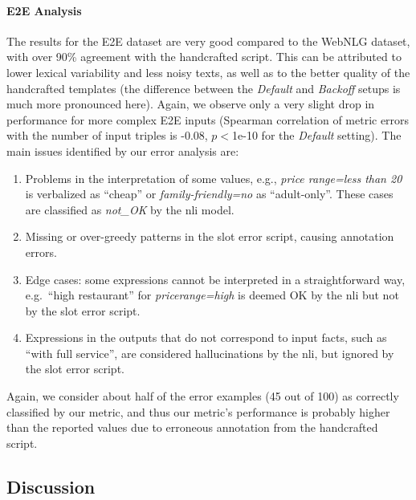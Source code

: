 




\paragraph{E2E Analysis} The results for the E2E dataset are very good compared to the WebNLG dataset, with over 90\% agreement with the handcrafted script. This can be attributed to lower lexical variability and less noisy texts, as well as to the better quality of the handcrafted templates (the difference between the \emph{Default} and \emph{Backoff} setups is much more pronounced here).
Again, we observe only a very slight drop in performance for more complex E2E inputs (Spearman correlation of metric errors with the number of input triples is -0.08, $p<$1e-10 for the \emph{Default} setting). The main issues identified by our error analysis are:
\begin{enumerate}
    \item Problems in the interpretation of some values, e.g., \textit{price range=less than \textsterling{}20} is verbalized as ``cheap'' or \textit{family-friendly=no} as ``adult-only''. These cases are classified as \emph{not\_OK} by the \ac{nli} model.
    \item Missing or over-greedy patterns in the slot error script, causing annotation errors.
    \item Edge cases: some expressions cannot be interpreted in a straightforward way, e.g.\ ``high restaurant'' for \emph{pricerange=high} is deemed OK by the \ac{nli} but not by the slot error script.
    \item Expressions in the outputs that do not correspond to input facts, such as ``with full service'', are considered hallucinations by the \ac{nli}, but ignored by the slot error script.
\end{enumerate}
Again, we consider about half of the error examples (45 out of 100) as correctly classified by our metric, and thus our metric's performance is probably higher than the reported values due to erroneous annotation from the handcrafted script.

\subsection{Discussion}

